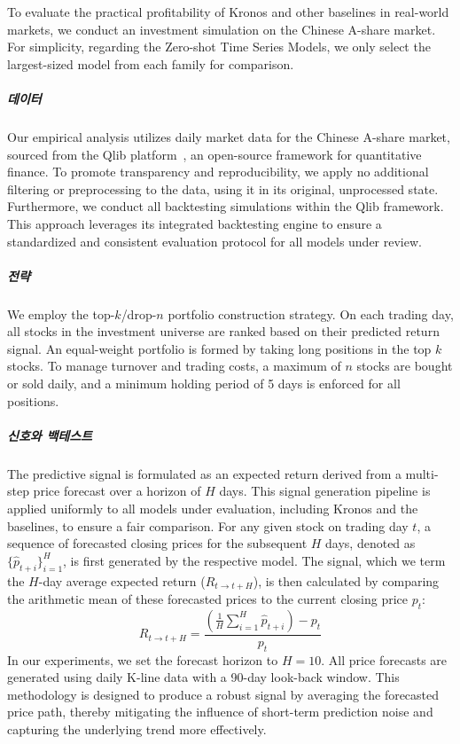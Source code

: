 To evaluate the practical profitability of Kronos and other baselines in real-world markets, we conduct an investment simulation on the Chinese A-share market. For simplicity, regarding the Zero-shot Time Series Models, we only select the largest-sized model from each family for comparison.

\subparagraph{데이터} Our empirical analysis utilizes daily market data for the Chinese A-share market, sourced from the Qlib platform~\cite{yang2020qlib}, an open-source framework for quantitative finance. To promote transparency and reproducibility, we apply no additional filtering or preprocessing to the data, using it in its original, unprocessed state. Furthermore, we conduct all backtesting simulations within the Qlib framework. This approach leverages its integrated backtesting engine to ensure a standardized and consistent evaluation protocol for all models under review.

\subparagraph{전략} We employ the top-$k$/drop-$n$ portfolio construction strategy. On each trading day, all stocks in the investment universe are ranked based on their predicted return signal. An equal-weight portfolio is formed by taking long positions in the top $k$ stocks. To manage turnover and trading costs, a maximum of $n$ stocks are bought or sold daily, and a minimum holding period of 5 days is enforced for all positions.

\subparagraph{신호와 백테스트}

The predictive signal is formulated as an expected return derived from a multi-step price forecast over a horizon of $H$ days. This signal generation pipeline is applied uniformly to all models under evaluation, including Kronos and the baselines, to ensure a fair comparison. For any given stock on trading day $t$, a sequence of forecasted closing prices for the subsequent $H$ days, denoted as $\{\hat{p}_{t+i}\}_{i=1}^{H}$, is first generated by the respective model. The signal, which we term the $H$-day average expected return ($R_{t \to t+H}$), is then calculated by comparing the arithmetic mean of these forecasted prices to the current closing price $p_t$:
\begin{equation}
R_{t \to t+H} = \frac{\left(\frac{1}{H}\sum_{i=1}^{H} \hat{p}_{t+i}\right) - p_t}{p_t}
\end{equation}
In our experiments, we set the forecast horizon to $H=10$. All price forecasts are generated using daily K-line data with a 90-day look-back window. This methodology is designed to produce a robust signal by averaging the forecasted price path, thereby mitigating the influence of short-term prediction noise and capturing the underlying trend more effectively.

